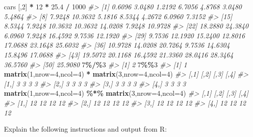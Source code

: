\documentclass[
]{book}
\newenvironment{Shaded}{\begin{snugshade}}{\end{snugshade}}
\newcommand{\AttributeTok}[1]{\textcolor[rgb]{0.13,0.29,0.53}{#1}}
\newcommand{\CommentTok}[1]{\textcolor[rgb]{0.56,0.35,0.01}{\textit{#1}}}
\newcommand{\DecValTok}[1]{\textcolor[rgb]{0.00,0.00,0.81}{#1}}
\newcommand{\FloatTok}[1]{\textcolor[rgb]{0.00,0.00,0.81}{#1}}
\newcommand{\FunctionTok}[1]{\textcolor[rgb]{0.13,0.29,0.53}{\textbf{#1}}}
\newcommand{\NormalTok}[1]{#1}
\newcommand{\SpecialCharTok}[1]{\textcolor[rgb]{0.81,0.36,0.00}{\textbf{#1}}}
\begin{document}
\begin{Shaded}
\begin{Highlighting}[]
\NormalTok{cars [,}\DecValTok{2}\NormalTok{] }\SpecialCharTok{*} \DecValTok{12} \SpecialCharTok{*} \FloatTok{25.4} \SpecialCharTok{/} \DecValTok{1000}
\CommentTok{\#\textgreater{}  [1]  0.6096  3.0480  1.2192  6.7056  4.8768  3.0480  5.4864}
\CommentTok{\#\textgreater{}  [8]  7.9248 10.3632  5.1816  8.5344  4.2672  6.0960  7.3152}
\CommentTok{\#\textgreater{} [15]  8.5344  7.9248 10.3632 10.3632 14.0208  7.9248 10.9728}
\CommentTok{\#\textgreater{} [22] 18.2880 24.3840  6.0960  7.9248 16.4592  9.7536 12.1920}
\CommentTok{\#\textgreater{} [29]  9.7536 12.1920 15.2400 12.8016 17.0688 23.1648 25.6032}
\CommentTok{\#\textgreater{} [36] 10.9728 14.0208 20.7264  9.7536 14.6304 15.8496 17.0688}
\CommentTok{\#\textgreater{} [43] 19.5072 20.1168 16.4592 21.3360 28.0416 28.3464 36.5760}
\CommentTok{\#\textgreater{} [50] 25.9080}
\DecValTok{7}\SpecialCharTok{\%/\%}\DecValTok{3}
\CommentTok{\#\textgreater{} [1] 2}
\DecValTok{7}\SpecialCharTok{\%\%}\DecValTok{3}
\CommentTok{\#\textgreater{} [1] 1}
\FunctionTok{matrix}\NormalTok{(}\DecValTok{1}\NormalTok{,}\AttributeTok{nrow=}\DecValTok{4}\NormalTok{,}\AttributeTok{ncol=}\DecValTok{4}\NormalTok{) }\SpecialCharTok{*} \FunctionTok{matrix}\NormalTok{(}\DecValTok{3}\NormalTok{,}\AttributeTok{nrow=}\DecValTok{4}\NormalTok{,}\AttributeTok{ncol=}\DecValTok{4}\NormalTok{)}
\CommentTok{\#\textgreater{}      [,1] [,2] [,3] [,4]}
\CommentTok{\#\textgreater{} [1,]    3    3    3    3}
\CommentTok{\#\textgreater{} [2,]    3    3    3    3}
\CommentTok{\#\textgreater{} [3,]    3    3    3    3}
\CommentTok{\#\textgreater{} [4,]    3    3    3    3}
\FunctionTok{matrix}\NormalTok{(}\DecValTok{1}\NormalTok{,}\AttributeTok{nrow=}\DecValTok{4}\NormalTok{,}\AttributeTok{ncol=}\DecValTok{4}\NormalTok{) }\SpecialCharTok{\%*\%} \FunctionTok{matrix}\NormalTok{(}\DecValTok{3}\NormalTok{,}\AttributeTok{nrow=}\DecValTok{4}\NormalTok{,}\AttributeTok{ncol=}\DecValTok{4}\NormalTok{)}
\CommentTok{\#\textgreater{}      [,1] [,2] [,3] [,4]}
\CommentTok{\#\textgreater{} [1,]   12   12   12   12}
\CommentTok{\#\textgreater{} [2,]   12   12   12   12}
\CommentTok{\#\textgreater{} [3,]   12   12   12   12}
\CommentTok{\#\textgreater{} [4,]   12   12   12   12}
\end{Highlighting}
\end{Shaded}

Explain the following instructions and output from R:
\end{document}
